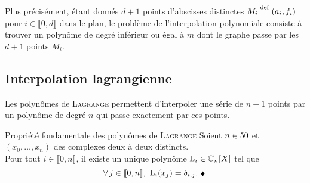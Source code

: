 Plus précisément, étant donnés $d+1$ points d'abscisses distinctes $M_i \overset{\mathrm{\tiny def}}{=} (a_i, f_i)$ pour $i \in \llbracket 0, d \rrbracket$ dans le plan, le problème de l'interpolation polynomiale consiste à trouver un polynôme de degré inférieur ou égal à $m$ dont le graphe passe par les $d+1$ points $M_i$.\\

\subsection{Interpolation lagrangienne}

Les polynômes de \textsc{Lagrange} permettent d'interpoler une série de $n+1$ points par un polynôme de degré $n$ qui passe exactement par ces points.

\begin{theo}{Propriété fondamentale des polynômes de \textsc{Lagrange}}
    Soient $n \in 50$ et $(x_0, \dots, x_n)$ des complexes deux à deux distincts. \\
    Pour tout $i \in \llbracket 0, n \rrbracket$, il existe un unique polynôme $\mathrm{L}_i \in \mathbb{C}_n[X]$ tel que 
    \begin{equation} \label{prop_fondamentale}
        \forall j \in \llbracket 0, n \rrbracket,\ \Lag_i(x_j) = \delta_{i,j}.\ \note
    \end{equation}
\end{theo}


